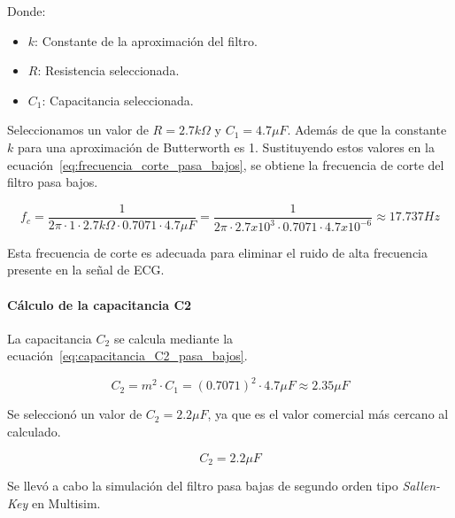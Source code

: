             Donde:
            \begin{itemize}
                \item $k$: Constante de la aproximación del filtro.
                \item $R$: Resistencia seleccionada.
                \item $C_1$: Capacitancia seleccionada.
            \end{itemize}

            Seleccionamos un valor de $R = 2.7 k\Omega$ y $C_1 = 4.7 \mu F$. Además de que la constante $k$ para una aproximación de Butterworth es 1. Sustituyendo estos valores en la ecuación~\ref{eq:frecuencia_corte_pasa_bajos}, se obtiene la frecuencia de corte del filtro pasa bajos.

            \begin{equation}
                \label{eq:frecuencia_corte_pasa_bajos_valor}
                f_c = \frac{1}{2\pi \cdot 1 \cdot 2.7 k\Omega \cdot 0.7071\cdot 4.7 \mu F} = \frac{1}{2\pi \cdot 2.7 x10^3 \cdot 0.7071\cdot 4.7 x10^{-6}} \approx 17.737 Hz
            \end{equation}

            Esta frecuencia de corte es adecuada para eliminar el ruido de alta frecuencia presente en la señal de ECG.

            \paragraph{Cálculo de la capacitancia C2}
            La capacitancia $C_2$ se calcula mediante la ecuación~\ref{eq:capacitancia_C2_pasa_bajos}.

            \begin{equation}
                \label{eq:capacitancia_C2_pasa_bajos}
                C_2 = m^2 \cdot C_1 = (0.7071)^2 \cdot 4.7 \mu F \approx 2.35 \mu F
            \end{equation}

            Se seleccionó un valor de $C_2 = 2.2 \mu F$, ya que es el valor comercial más cercano al calculado.

            \begin{equation}
                C_2 = 2.2 \mu F
            \end{equation}

            Se llevó a cabo la simulación del filtro pasa bajas de segundo orden tipo \textit{Sallen-Key} en Multisim. 
            
